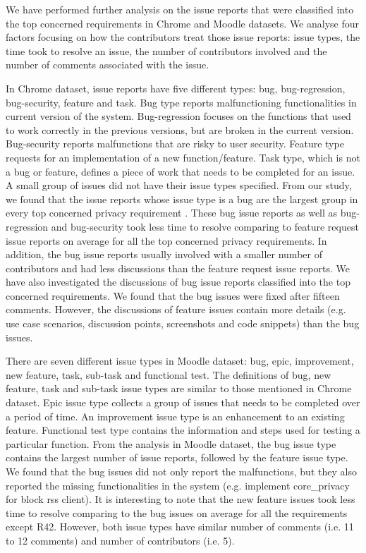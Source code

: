 We have performed further analysis on the issue reports that were classified into the top concerned requirements in Chrome and Moodle datasets. We analyse four factors focusing on how the contributors treat those issue reports: issue types, the time took to resolve an issue, the number of contributors involved and the number of comments associated with the issue.

In Chrome dataset, issue reports have five different types: bug, bug-regression, bug-security, feature and task. Bug type reports malfunctioning functionalities in current version of the system. Bug-regression focuses on the functions that used to work correctly in the previous versions, but are broken in the current version. Bug-security reports malfunctions that are risky to user security. Feature type requests for an implementation of a new function/feature. Task type, which is not a bug or feature, defines a piece of work that needs to be completed for an issue. A small group of issues did not have their issue types specified. From our study, we found that the issue reports whose issue type is a bug are the largest group in every top concerned privacy requirement . These bug issue reports as well as bug-regression and bug-security took less time to resolve comparing to feature request issue reports on average for all the top concerned privacy requirements. In addition, the bug issue reports usually involved with a smaller number of contributors and had less discussions than the feature request issue reports. We have also investigated the discussions of bug issue reports classified into the top concerned requirements. We found that the bug issues were fixed after fifteen comments. However, the discussions of feature issues contain more details (e.g. use case scenarios, discussion points, screenshots and code snippets) than the bug issues.

There are seven different issue types in Moodle dataset: bug, epic, improvement, new feature, task, sub-task and functional test. The definitions of bug, new feature, task and sub-task issue types are similar to those mentioned in Chrome dataset. Epic issue type collects a group of issues that needs to be completed over a period of time. An improvement issue type is an enhancement to an existing feature. Functional test type contains the information and steps used for testing a particular function. From the analysis in Moodle dataset, the bug issue type contains the largest number of issue reports, followed by the feature issue type. We found that the bug issues did not only report the malfunctions, but they also reported the missing functionalities in the system (e.g. implement core\_privacy for block rss client). It is interesting to note that the new feature issues took less time to resolve comparing to the bug issues on average for all the requirements except R42. However, both issue types have similar number of comments (i.e. 11 to 12 comments) and number of contributors (i.e. 5).

